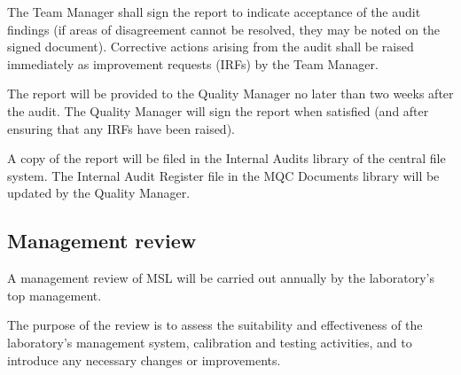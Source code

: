 The Team Manager shall sign the report to indicate acceptance of the audit findings (if areas of disagreement cannot be resolved, they may be noted on the signed document). Corrective actions arising from the audit shall be raised immediately as improvement requests (IRFs) by the Team Manager. 

The report will be provided to the Quality Manager no later than two weeks after the audit. The Quality Manager will sign the report when satisfied (and after ensuring that any IRFs have been raised). 

A copy of the report will be filed in the Internal Audits library of the central file system. The Internal Audit Register file in the MQC Documents library will be updated by the Quality Manager.

\subsection{Management review}
\label{ss:management_review}
A management review of MSL will be carried out annually by the laboratory’s top management. 

The purpose of the review is to assess the suitability and effectiveness of the laboratory’s management system, calibration and testing activities, and to introduce any necessary changes or improvements.   

